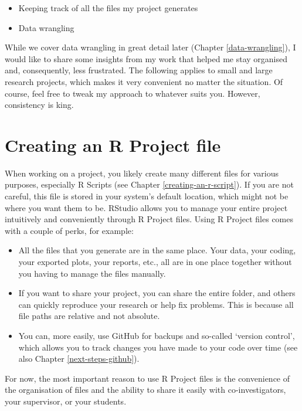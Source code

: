 \documentclass[
]{book}
\begin{document}
\begin{itemize}
\item
  Keeping track of all the files my project generates
\item
  Data wrangling
\end{itemize}

While we cover data wrangling in great detail later (Chapter \ref{data-wrangling}), I would like to share some insights from my work that helped me stay organised and, consequently, less frustrated. The following applies to small and large research projects, which makes it very convenient no matter the situation. Of course, feel free to tweak my approach to whatever suits you. However, consistency is king.

\hypertarget{creating-an-r-project-file}{%
\section{Creating an R Project file}\label{creating-an-r-project-file}}

When working on a project, you likely create many different files for various purposes, especially R Scripts (see Chapter \ref{creating-an-r-script}). If you are not careful, this file is stored in your system's default location, which might not be where you want them to be. RStudio allows you to manage your entire project intuitively and conveniently through R Project files. Using R Project files comes with a couple of perks, for example:

\begin{itemize}
\item
  All the files that you generate are in the same place. Your data, your coding, your exported plots, your reports, etc., all are in one place together without you having to manage the files manually.
\item
  If you want to share your project, you can share the entire folder, and others can quickly reproduce your research or help fix problems. This is because all file paths are relative and not absolute.
\item
  You can, more easily, use GitHub for backups and so-called `version control', which allows you to track changes you have made to your code over time (see also Chapter \ref{next-steps-github}).
\end{itemize}

For now, the most important reason to use R Project files is the convenience of the organisation of files and the ability to share it easily with co-investigators, your supervisor, or your students.
\end{document}
